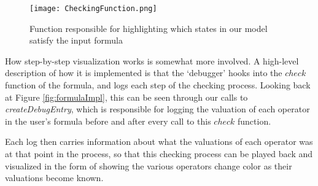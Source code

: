 \begin{figure}[h]
	\label{fig:CheckingFunction}
	\texttt{[image: CheckingFunction.png]}
	\caption{Function responsible for highlighting which states in our model satisfy the input formula}
\end{figure}

How step-by-step visualization works is somewhat more involved. A high-level description of how it is implemented is that the `debugger' hooks into the $check$ function of the formula, and logs each step of the checking process. Looking back at Figure \ref{fig:formulaImpl}, this can be seen through our calls to \textit{createDebugEntry}, which is responsible for logging the valuation of each operator in the user's formula before and after every call to this $check$ function.

Each log then carries information about what the valuations of each operator was at that point in the process, so that this checking process can be played back and visualized in the form of showing the various operators change color as their valuations become known. 
 












